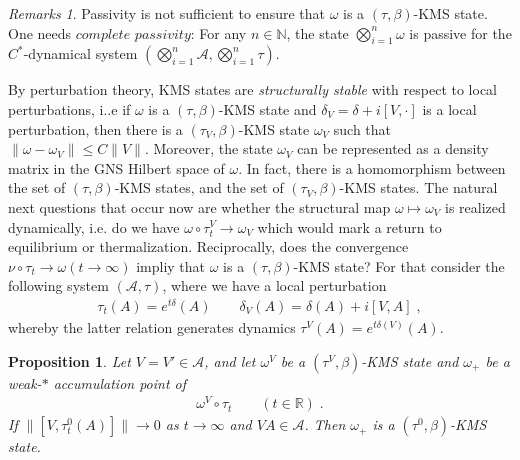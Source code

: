 \documentclass[
a4paper, %
11pt, %
onecolumn, %
openany, %
]{memoir}
\theoremstyle{definition}
\theoremstyle{remark}
\newtheorem{remarks}{Remarks}[chapter]
\theoremstyle{plain}
\newtheorem{prop}{Proposition}[chapter]
\begin{document}
\begin{remarks}
Passivity is not sufficient to ensure that $\omega$ is a $(\tau,\beta)$-KMS state. One needs $\textit{complete passivity}$: For any $n\in\mathbb{N}$, the state $\bigotimes
_{i=1}^n\omega$ is passive for the $C^*$-dynamical system $(\bigotimes_{i=1}^n \mathcal{A},\bigotimes_{i=1}^n\tau)$.
\end{remarks}
By perturbation theory, KMS states are \textit{structurally stable} with respect to local perturbations, i..e if $\omega$ is a $(\tau,\beta)$-KMS state and $\delta_V=\delta+i[V,\cdot]$ is a local perturbation, then there is a $(\tau_V,\beta)$-KMS state $\omega_V$ such that $\|\omega-\omega_V\|\leq C\|V\|$. Moreover, the state $\omega_V$ can be represented as a density matrix in the GNS Hilbert space of $\omega$. In fact, there is a homomorphism between the set of $(\tau,\beta)$-KMS states, and the set of $(\tau_V,\beta)$-KMS states. 
The natural next questions that occur now are whether the structural map $\omega\mapsto\omega_V$ is realized dynamically, i.e. do we have $\omega\circ\tau_t^V\rightarrow\omega_V$ which would mark a return to equilibrium or thermalization. Reciprocally, does the convergence $\nu\circ \tau_t\rightarrow\omega(t\rightarrow\infty)$ impliy that $\omega$ is a $(\tau,\beta)$-KMS state?
For that consider the following system $(\mathcal{A},\tau)$, where we have a local perturbation \begin{align}
\tau_t(A)=e^{t\delta}(A) \qquad \delta_V(A)=\delta(A)+i[V,A]\; ,
\end{align}
whereby the latter relation generates dynamics $\tau^V(A)=e^{t\delta(V)}(A)$.
\begin{prop}
Let $V=V'\in\mathcal{A}$, and let $\omega^V$ be a $(\tau^V,\beta)$-KMS state and $\omega_+$ be a weak-$*$ accumulation point of \begin{align}
\omega^V\circ \tau_t\qquad (t\in\mathbb{R})\; .
\end{align}
If $\| [V,\tau_t^0(A)]\| \rightarrow 0$ as $t\rightarrow \infty$ and $VA\in\mathcal{A}$. Then $\omega_+$ is a $(\tau^0,\beta)$-KMS state.
\end{prop}
\end{document}
